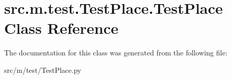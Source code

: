 \hypertarget{classsrc_1_1m_1_1test_1_1_test_place_1_1_test_place}{}\section{src.\+m.\+test.\+Test\+Place.\+Test\+Place Class Reference}
\label{classsrc_1_1m_1_1test_1_1_test_place_1_1_test_place}


The documentation for this class was generated from the following file\+:\begin{DoxyCompactItemize}
\item 
src/m/test/Test\+Place.\+py\end{DoxyCompactItemize}
